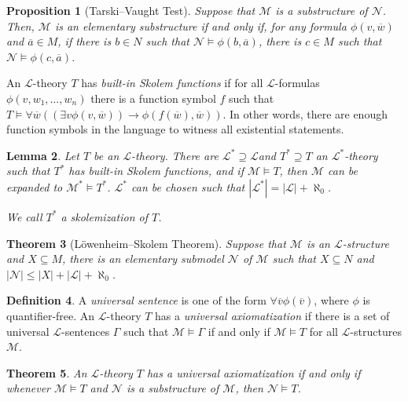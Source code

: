 \documentclass{amsart}
\newtheorem{theorem}{Theorem}[subsection]
\newtheorem{lemma}[theorem]{Lemma}
\newtheorem{proposition}[theorem]{Proposition}
\theoremstyle{definition}
\newtheorem{definition}[theorem]{Definition}
\numberwithin{equation}{section}
\begin{document}
\begin{proposition}[Tarski--Vaught Test]
    Suppose that $\mathcal{M}$ is a substructure of $\mathcal{N}$.
    Then, $\mathcal{M}$ is an elementary substructure if and only if,
    for any formula $\phi(v,\overline{w})$ and $\overline{a} \in M$,
    if there is $b \in N$ such that $\mathcal{N} \models \phi(b,\overline{a})$,
    there is $c \in M$ such that $\mathcal{N} \models \phi(c,\overline{a})$.
\end{proposition}

An $\mathcal{L}$-theory $T$ has \emph{built-in Skolem functions}
if for all $\mathcal{L}$-formulas $\phi(v,w_1,\dots,w_n)$ there is a function symbol $f$ such that $T \models \forall \overline{w} ((\exists v \phi(v,\overline{w})) \to \phi(f(\overline{w}),\overline{w}))$.
In other words, there are enough function symbols in the language to witness all existential statements.

\begin{lemma}
    Let $T$ be an $\mathcal{L}$-theory. 
    There are $\mathcal{L}^* \supseteq \mathcal{L}$and $T^* \supseteq T$ an $\mathcal{L}^*$-theory such that $T^*$ has built-in Skolem functions, 
    and if $\mathcal{M} \models T$, 
    then $\mathcal{M}$ can be expanded to $\mathcal{M}^* \models T^*$. 
    $\mathcal{L}^*$ can be chosen such that $|\mathcal{L}^*|= |\mathcal{L}|+\aleph_0$.

    We call $T^*$ a skolemization of $T$.
\end{lemma}

\begin{theorem}[L\"owenheim--Skolem Theorem]
    Suppose that $\mathcal{M}$ is an $\mathcal{L}$-structure and 
    $X \subseteq M$, there is an elementary submodel $\mathcal{N}$ of $\mathcal{M}$ such that $X \subseteq N$ and $|\mathcal{N}| \le |X| + |\mathcal{L}| + \aleph_0$.
\end{theorem}

\begin{definition}
    A \emph{universal sentence} is one of the form 
    $\forall \overline{v} \phi(\overline{v})$,
    where $\phi$ is quantifier-free.
    An $\mathcal{L}$-theory $T$ has a \emph{universal axiomatization} if there is a set of universal $\mathcal{L}$-sentences $\Gamma$
    such that $\mathcal{M} \models \Gamma$ if and only if $\mathcal{M} \models T$ for all $\mathcal{L}$-structures $\mathcal{M}$.
\end{definition}

\begin{theorem}
    An $\mathcal{L}$-theory $T$ has a universal axiomatization if and only if 
    whenever $\mathcal{M} \models T$ and $\mathcal{N}$ is a substructure of $\mathcal{M}$,
    then $\mathcal{N} \models T$.
\end{theorem}
\end{document}
